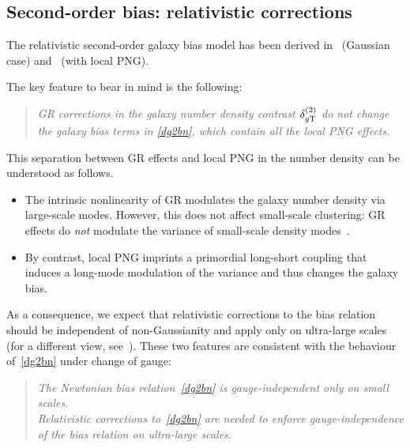 {\subsection{Second-order bias: {relativistic corrections}}
%
{The relativistic second-order galaxy bias model has been derived in~\cite{Umeh:2019qyd} (Gaussian case) and~\cite{Umeh:2019jqg} (with local PNG). {The key feature to bear in mind is the following:
 \begin{quote} 
{\em GR corrections in the galaxy number density contrast $\delta^{{(2)}}_{g{\mathrm{T}}}$ do not change the galaxy bias terms in \eqref{dg2bn}, which contain all the local PNG effects.}
\end{quote}
This separation between GR effects and local PNG in the number density can be understood as follows. 
\begin{itemize}
\item
The intrinsic  nonlinearity of GR  modulates the galaxy number density  via large-scale modes. 
However,  this does not affect small-scale clustering: GR effects do {\em not} modulate the variance of small-scale density modes~\cite{Koyama:2018ttg,Dai:2015jaa,dePutter:2015vga}.
\item
By contrast, local PNG imprints a primordial long-short coupling that induces a long-mode modulation of the variance and thus changes the galaxy bias.
\end{itemize}
As a consequence, we expect that relativistic corrections to the bias relation should be independent of  non-Gaussianity and apply only on ultra-large scales  (for a different view, see~\cite{Matarrese:2020why}). 
These two features are consistent with the behaviour of~\eqref{dg2bn} under change of gauge:
 \begin{quote} 
{\em The Newtonian bias relation~\eqref{dg2bn} is gauge-independent only on small scales.\\
Relativistic
corrections to~\eqref{dg2bn}  are needed to enforce gauge-independence of the bias relation on ultra-large scales.}
\end{quote}

}}}
